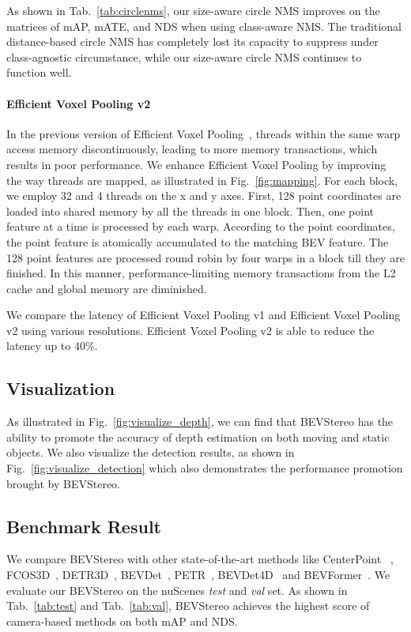 \documentclass[letterpaper]{article} \usepackage[]{aaai23}  \usepackage{times}  \usepackage{helvet}  \usepackage{courier}  \usepackage[hyphens]{url}  \usepackage{graphicx} \urlstyle{rm} \def\UrlFont{\rm}  \usepackage{natbib}  \usepackage{caption} \frenchspacing  \setlength{\pdfpagewidth}{8.5in} \setlength{\pdfpageheight}{11in} \usepackage{algorithm}
\begin{document}
As shown in Tab.~\ref{tab:circlenms}, our size-aware circle NMS improves on the matrices of mAP, mATE, and NDS when using class-aware NMS. The traditional distance-based circle NMS has completely lost its capacity to suppress under class-agnostic circumstance, while our size-aware circle NMS continues to function well.

\paragraph{Efficient Voxel Pooling v2}
In the previous version of Efficient Voxel Pooling~\cite{li2022bevdepth}, threads within the same warp access memory discontinuously, leading to more memory transactions, which results in poor performance. We enhance Efficient Voxel Pooling by improving the way threads are mapped, as illustrated in Fig.~\ref{fig:mapping}. For each block, we employ 32 and 4 threads on the x and y axes. First, 128 point coordinates are loaded into shared memory by all the threads in one block. Then, one point feature at a time is processed by each warp. According to the point coordinates, the point feature is atomically accumulated to the matching BEV feature. The 128 point features are processed round robin by four warps in a block till they are finished. In this manner, performance-limiting memory transactions from the L2 cache and global memory are diminished.

We compare the latency of Efficient Voxel Pooling v1 and Efficient Voxel Pooling v2 using various resolutions. Efficient Voxel Pooling v2 is able to reduce the latency up to 40\%.

\subsection{Visualization}
As illustrated in Fig.~\ref{fig:visualize_depth}, we can find that BEVStereo has the ability to promote the accuracy of depth estimation on both moving and static objects. We also visualize the detection results, as shown in Fig.~\ref{fig:visualize_detection} which also demonstrates the performance promotion brought by BEVStereo.




\subsection{Benchmark Result}
We compare BEVStereo with other state-of-the-art methods like CenterPoint ~\cite{yin2021center}, FCOS3D~\cite{wang2021fcos3d}, DETR3D~\cite{wang2022detr3d}, BEVDet~\cite{huang2021bevdet}, PETR~\cite{liu2022petr}, BEVDet4D~\cite{huang2022bevdet4d} and BEVFormer~\cite{li2022bevformer}. We evaluate our BEVStereo on the nuScenes \emph{test} and \emph{val} set. As shown in Tab.~\ref{tab:test} and Tab.~\ref{tab:val}, BEVStereo achieves the highest score of camera-based methods on both mAP and NDS.
\end{document}
